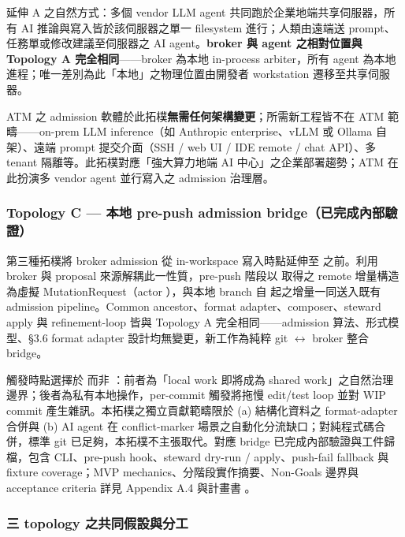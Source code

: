 \documentclass[a4paper,fontset=none]{ctexart}
\begin{document}
延伸 A 之自然方式：多個 vendor LLM agent 共同跑於企業地端共享伺服器，所有 AI 推論與寫入皆於該伺服器之單一 filesystem 進行；人類由遠端送 prompt、任務單或修改建議至伺服器之 AI agent。\textbf{broker 與 agent 之相對位置與 Topology A 完全相同}------broker 為本地 in-process arbiter，所有 agent 為本地進程；唯一差別為此「本地」之物理位置由開發者 workstation 遷移至共享伺服器。

ATM 之 admission 軟體於此拓樸\textbf{無需任何架構變更}；所需新工程皆不在 ATM 範疇------on-prem LLM inference（如 Anthropic enterprise、vLLM 或 Ollama 自架）、遠端 prompt 提交介面（SSH / web UI / IDE remote / chat API）、多 tenant 隔離等。此拓樸對應「強大算力地端 AI 中心」之企業部署趨勢；ATM 在此扮演多 vendor agent 並行寫入之 admission 治理層。

\subsubsection*{Topology C --- 本地 pre-push admission bridge（已完成內部驗證）}

第三種拓樸將 broker admission 從 in-workspace 寫入時點延伸至 \texttt{} 之前。利用 broker \texttt{} 與 proposal 來源解耦此一性質，pre-push 階段以 \texttt{} 取得之 remote 增量構造為虛擬 MutationRequest（actor \texttt{}），與本地 branch 自 \texttt{} 起之增量一同送入既有 admission pipeline。Common ancestor、format adapter、composer、steward apply 與 refinement-loop 皆與 Topology A 完全相同------admission 算法、形式模型、§3.6 format adapter 設計均無變更，新工作為純粹 git $\leftrightarrow$ broker 整合 bridge。

觸發時點選擇於 \texttt{} 而非 \texttt{}：前者為「local work 即將成為 shared work」之自然治理邊界；後者為私有本地操作，per-commit 觸發將拖慢 edit/test loop 並對 WIP commit 產生雜訊。本拓樸之獨立貢獻範疇限於 (a) 結構化資料之 format-adapter 合併與 (b) AI agent 在 conflict-marker 場景之自動化分流缺口；對純程式碼合併，標準 git \texttt{} 已足夠，本拓樸不主張取代。對應 bridge 已完成內部驗證與工件歸檔，包含 \texttt{} CLI、pre-push hook、steward dry-run / apply、push-fail fallback 與 fixture coverage；MVP mechanics、分階段實作摘要、Non-Goals 邊界與 acceptance criteria 詳見 Appendix A.4 與計畫書 \texttt{}。

\subsubsection*{三 topology 之共同假設與分工}
\end{document}
